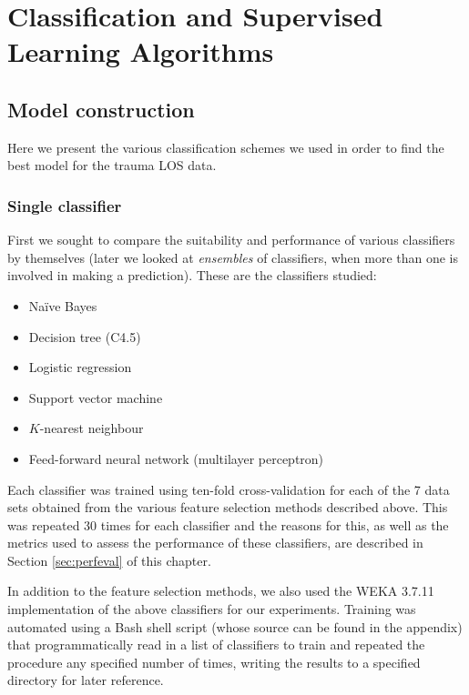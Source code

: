 \chapter{Classification and Supervised Learning Algorithms}
  \label{chap:classification}

\section{Model construction}
Here we present the various classification schemes we used in order to find
the best model for the trauma LOS data.

\subsection{Single classifier}
First we sought to compare the suitability and performance of various
classifiers by themselves (later we looked at \textit{ensembles} of
classifiers, when more than one is involved in making a prediction).
These are the
classifiers studied: 
\begin{itemize}
  \item Na\"{i}ve Bayes
  \item Decision tree (C4.5)
  \item Logistic regression
  \item Support vector machine
  \item $K$-nearest neighbour
  \item Feed-forward neural network (multilayer perceptron)
\end{itemize}

Each classifier was trained using ten-fold cross-validation for each of the
7 data sets obtained from the various feature selection methods described
above. This was repeated 30 times for each classifier and the reasons for
this, as well as the metrics used to assess the performance of these
classifiers, are described in Section \ref{sec:perfeval} of this chapter.

In addition to the feature selection methods, we also used the WEKA 3.7.11
\citep{Hall2009} implementation of the above classifiers for our experiments.
Training was automated using a Bash shell script (whose source can be found
in the appendix) that programmatically read in a list of classifiers to
train and repeated the procedure any specified number of times, writing the
results to a specified directory for later reference.


